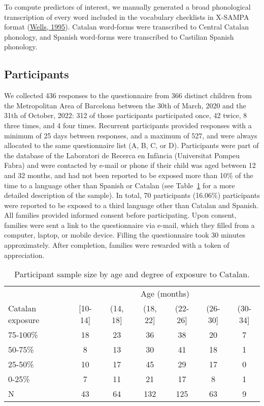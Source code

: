 \documentclass[
]{article}
\begin{document}
To compute predictors of interest, we manually generated a broad
phonological transcription of every word included in the vocabulary
checklists in X-SAMPA format
(\protect\hyperlink{ref-wells1995computercoding}{Wells, 1995}). Catalan
word-forms were transcribed to Central Catalan phonology, and Spanish
word-forms were transcribed to Castilian Spanish phonology.

\hypertarget{sec-participants}{%
\subsection{Participants}\label{sec-participants}}

We collected 436 responses to the questionnaire from 366 distinct
children from the Metropolitan Area of Barcelona between the 30th of
March, 2020 and the 31th of October, 2022: 312 of those participants
participated once, 42 twice, 8 three times, and 4 four times. Recurrent
participants provided responses with a minimum of 25 days between
responses, and a maximum of 527, and were always allocated to the same
questionnaire list (A, B, C, or D). Participants were part of the
database of the Laboratori de Recerca en Infància (Universitat Pompeu
Fabra) and were contacted by e-mail or phone if their child was aged
between 12 and 32 months, and had not been reported to be exposed more
than 10\% of the time to a language other than Spanish or Catalan (see
Table~\ref{tbl-participants} for a more detailed description of the
sample). In total, 70 participants (16.06\%) participants were reported
to be exposed to a third language other than Catalan and Spanish. All
families provided informed consent before participating. Upon consent,
families were sent a link to the questionnaire via e-mail, which they
filled from a computer, laptop, or mobile device. Filling the
questionnaire took 30 minutes approximately. After completion, families
were rewarded with a token of appreciation.

\hypertarget{tbl-participants}{}
\begin{table}
\caption{\label{tbl-participants}Participant sample size by age and degree of exposure to Catalan. }\tabularnewline

\centering
\begin{tabular}{lcccccc}
\toprule
\multicolumn{1}{c}{ } & \multicolumn{6}{c}{Age (months)} \\
\cmidrule(l{3pt}r{3pt}){2-7}
Catalan exposure & {}[10-14] & (14, 18] & (18, 22] & (22-26] & (26-30] & (30-34]\\
\midrule
75-100\% & 18 & 23 & 36 & 38 & 20 & 7\\
50-75\% & 8 & 13 & 30 & 41 & 18 & 1\\
25-50\% & 10 & 17 & 45 & 29 & 17 & 0\\
0-25\% & 7 & 11 & 21 & 17 & 8 & 1\\
\midrule
N & 43 & 64 & 132 & 125 & 63 & 9\\
\bottomrule
\end{tabular}
\end{table}
\end{document}
